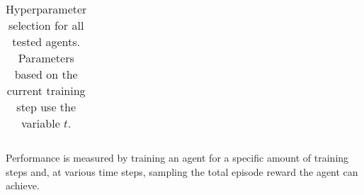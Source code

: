 \begin{table}[ht]
\begin{tabular}{|c|l||c|c|}
        \hline
    \end{tabular}
    \caption{Hyperparameter selection for all tested agents. Parameters based on the current training step use the variable $t$.}
    \label{tab:hyperparameters}
\end{table}

 Performance is measured by training an agent for a specific amount of training steps and, at various time steps, sampling the total episode reward the agent can achieve.
